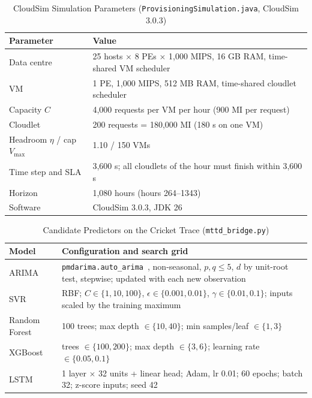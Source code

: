 \documentclass[journal,onecolumn,11pt]{IEEEtran}
\begin{document}
\begin{table}[H]
\centering
\caption{CloudSim Simulation Parameters (\texttt{ProvisioningSimulation.java}, CloudSim 3.0.3)}
\label{tab:sim}
\footnotesize
\begin{tabularx}{\linewidth}{@{}l L@{}}
\toprule
Parameter & Value\\
\midrule
Data centre & 25 hosts $\times$ 8 PEs $\times$ 1,000 MIPS, 16 GB RAM, time-shared VM scheduler\\
VM & 1 PE, 1,000 MIPS, 512 MB RAM, time-shared cloudlet scheduler\\
Capacity $C$ & 4,000 requests per VM per hour (900 MI per request)\\
Cloudlet & 200 requests = 180,000 MI (180 s on one VM)\\
Headroom $\eta$ / cap $V_{\max}$ & 1.10 / 150 VMs\\
Time step and SLA & 3,600 s; all cloudlets of the hour must finish within 3,600 s\\
Horizon & 1,080 hours (hours 264--1343)\\
Software & CloudSim 3.0.3, JDK 26\\
\bottomrule
\end{tabularx}
\end{table}

\begin{table}[H]
\centering
\caption{Candidate Predictors on the Cricket Trace (\texttt{mttd\_bridge.py})}
\label{tab:hyper}
\footnotesize
\begin{tabularx}{\linewidth}{@{}l L@{}}
\toprule
Model & Configuration and search grid\\
\midrule
ARIMA & \texttt{pmdarima.auto\_arima}~\cite{hyndman2008}, non-seasonal, $p,q\le5$, $d$ by unit-root test, stepwise; updated with each new observation\\
SVR & RBF; $C\in\{1,10,100\}$, $\epsilon\in\{0.001,0.01\}$, $\gamma\in\{0.01,0.1\}$; inputs scaled by the training maximum\\
Random Forest & 100 trees; max depth $\in\{10,40\}$; min samples/leaf $\in\{1,3\}$\\
XGBoost & trees $\in\{100,200\}$; max depth $\in\{3,6\}$; learning rate $\in\{0.05,0.1\}$\\
LSTM & 1 layer $\times$ 32 units + linear head; Adam, lr 0.01; 60 epochs; batch 32; z-score inputs; seed 42\\
\bottomrule
\end{tabularx}
\end{table}
\end{document}
